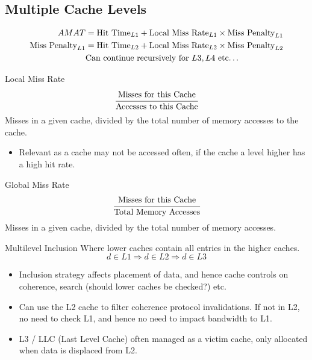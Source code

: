 \subsection{Multiple Cache Levels}
\[\begin{split}
		AMAT & = \text{Hit Time}_{L1} + \text{Local Miss Rate}_{L1} \times \text{Miss Penalty}_{L1} \\
		\text{Miss Penalty}_{L1} & = \text{Hit Time}_{L2} + \text{Local Miss Rate}_{L2} \times \text{Miss Penalty}_{L2} \\
		& \text{Can continue recursively for }L3, L4 \text{ etc\dots} \\
	\end{split}\]
\begin{tcbraster}[raster columns=2, raster equal height]
	\begin{definitionbox}{Local Miss Rate}
		\[\cfrac{\text{Misses for this Cache}}{\text{Accesses to this Cache}}\]
		Misses in a given cache, divided by the total number of memory accesses to the cache.
		\begin{itemize}
			\item Relevant as a cache may not be accessed often, if the cache a level higher has a high hit rate.
		\end{itemize}
	\end{definitionbox}
	\begin{definitionbox}{Global Miss Rate}
		\[\cfrac{\text{Misses for this Cache}}{\text{Total Memory Accesses}}\]
		Misses in a given cache, divided by the total number of memory accesses.
	\end{definitionbox}
\end{tcbraster}

\begin{definitionbox}{Multilevel Inclusion}
	Where lower caches contain all entries in the higher caches.
	\[d \in L1 \Rightarrow d \in L2 \Rightarrow d \in L3\]
\end{definitionbox}
\begin{itemize}
	\item Inclusion strategy affects placement of data, and hence cache controls on coherence, search (should lower caches be checked?) etc.
	\item Can use the L2 cache to filter coherence protocol invalidations. If not in L2, no need to check L1, and hence no need to impact bandwidth to L1.
	\item L3 / LLC (Last Level Cache) often managed as a victim cache, only allocated when data is displaced from L2.
\end{itemize}

